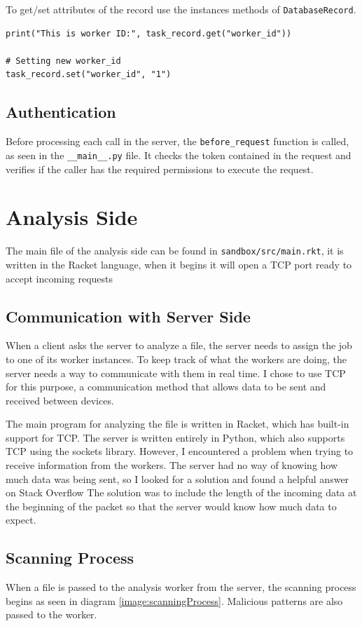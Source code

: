 To get/set attributes of the record use the instances methods of \texttt{DatabaseRecord}.

\begin{lstlisting}
print("This is worker ID:", task_record.get("worker_id"))

# Setting new worker_id
task_record.set("worker_id", "1")
\end{lstlisting}

\subsection{Authentication}
Before processing each call in the server,
the \texttt{before\_request} function is called,
as seen in the \texttt{\_\_main\_\_.py} file.
It checks the token contained in the request and
verifies if the caller has the required permissions to execute the request.

\section{Analysis Side}
The main file of the analysis side can be found in \texttt{sandbox/src/main.rkt},
it is written in the Racket language, when it begins it will open a TCP port ready to accept incoming requests

\subsection{Communication with Server Side}
When a client asks the server to analyze a file,
the server needs to assign the job to one of its worker instances.
To keep track of what the workers are doing,
the server needs a way to communicate with them in real time.
I chose to use TCP for this purpose,
a communication method that allows data to be sent and received between devices.

The main program for analyzing the file is written in Racket,
which has built-in support for TCP. The server is written entirely in Python,
which also supports TCP using the sockets library.
However, I encountered a problem when trying to receive information from the workers.
The server had no way of knowing how much data was being sent,
so I looked for a solution and found a
helpful answer on Stack Overflow \cite{chqrlie:2022}
The solution was to include the length of the incoming
data at the beginning of the packet
so that the server would know how much data to expect.

\subsection{Scanning Process}
When a file is passed to the analysis worker from the server,
the scanning process begins as seen in diagram \ref{image:scanningProcess}.
Malicious patterns are also passed to the worker.

